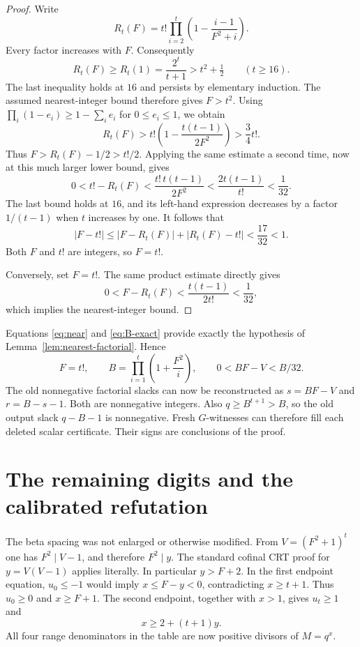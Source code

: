 \documentclass[11pt]{article}
\theoremstyle{definition}\newtheorem{definition}[theorem]{Definition}
\begin{document}
\begin{proof}
Write
\[
 R_t(F)=t!\prod_{i=2}^t
       \left(1-\frac{i-1}{F^2+i}\right).
\]
Every factor increases with \(F\). Consequently
\[
 R_t(F)\ge R_t(1)=\frac{2^t}{t+1}>t^2+\tfrac12
       \qquad(t\ge16).
\]
The last inequality holds at \(16\) and persists by elementary
induction. The assumed nearest-integer bound therefore gives \(F>t^2\).
Using \(\prod_i(1-e_i)\ge1-\sum_i e_i\) for \(0\le e_i\le1\),
we obtain
\[
 R_t(F)>
 t!\left(1-\frac{t(t-1)}{2F^2}\right)>\frac34t!.
\]
Thus \(F>R_t(F)-1/2>t!/2\). Applying the same estimate a second
time, now at this much larger lower bound, gives
\[
 0<t!-R_t(F)<\frac{t!\,t(t-1)}{2F^2}
                 <\frac{2t(t-1)}{t!}<\frac1{32}.
\]
The last bound holds at \(16\), and its left-hand expression decreases
by a factor \(1/(t-1)\) when \(t\) increases by one.
It follows that
\[
 |F-t!|\le |F-R_t(F)|+|R_t(F)-t!|<\frac{17}{32}<1.
\]
Both \(F\) and \(t!\) are integers, so \(F=t!\).

Conversely, set \(F=t!\). The same product estimate directly gives
\[
 0<F-R_t(F)<\frac{t(t-1)}{2t!}<\frac1{32},
\]
which implies the nearest-integer bound.
\end{proof}

Equations \eqref{eq:near} and \eqref{eq:B-exact} provide exactly
the hypothesis of Lemma~\ref{lem:nearest-factorial}. Hence
\begin{equation}\label{eq:factorial-recovered}
 F=t!,\qquad
 B=\prod_{i=1}^t\left(1+\frac{F^2}{i}\right),\qquad
 0<BF-V<B/32.
\end{equation}
The old nonnegative factorial slacks can now be reconstructed as
\(s=BF-V\) and \(r=B-s-1\). Both are nonnegative integers.
Also \(q\ge B^{t+1}>B\), so the old output slack \(q-B-1\)
is nonnegative. Fresh \(G\)-witnesses can therefore fill each
deleted scalar certificate. Their signs are conclusions of the proof.

\section{The remaining digits and the calibrated refutation}

The beta spacing was not enlarged or otherwise modified.
From \(V=(F^2+1)^t\) one has \(F^2\mid V-1\), and therefore
\(F^2\mid y\). The standard cofinal CRT proof for
\(y=V(V-1)\) applies literally. In particular \(y>F+2\).
In the first endpoint equation, \(u_0\le-1\) would imply
\(x\le F-y<0\), contradicting \(x\ge t+1\). Thus
\(u_0\ge0\) and \(x\ge F+1\).
The second endpoint, together with \(x>1\), gives \(u_t\ge1\) and
\begin{equation}\label{eq:strong-endpoint}
 x\ge2+(t+1)y.
\end{equation}
All four range denominators in the table are now positive divisors
of \(M=q^x\).
\end{document}
